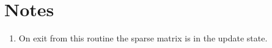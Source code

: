 \section*{Notes}
\begin{enumerate}
\item On exit from this routine the sparse matrix is in the update
  state. 
\end{enumerate}
%
%






